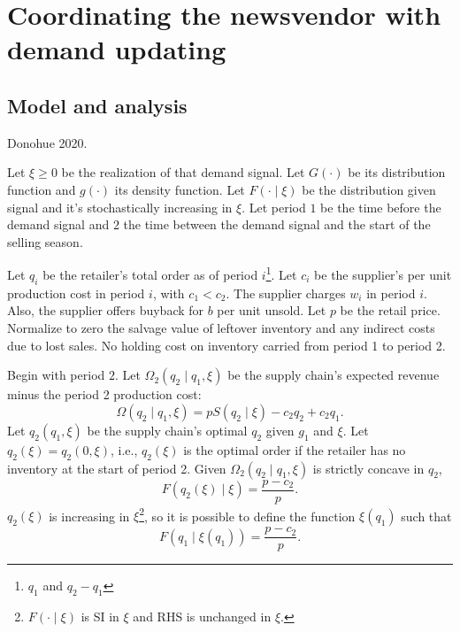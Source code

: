 \newpage
\section{Coordinating the newsvendor with demand updating}

\subsection{Model and analysis}
\begin{note}
    Donohue 2020.
\end{note}
Let $\xi\geq 0$ be the realization of that demand signal. Let $G(\cdot)$ be its distribution function and $g(\cdot)$ its density function. Let $F(\cdot\mid\xi)$ be the distribution given signal and it's stochastically increasing in $\xi$. Let period $1$ be the time before the demand signal and $2$ the time between the demand signal and the start of the selling season. 

Let $q_i$ be the retailer's total order as of period $i$\footnote{$q_1$ and $q_2-q_1$}. Let $c_i$ be the supplier's per unit production cost in period $i$, with $c_1<c_2$. The supplier charges $w_i$ in period $i$. Also, the supplier offers buyback for $b$ per unit unsold. Let $p$ be the retail price. Normalize to zero the salvage value of leftover inventory and any indirect costs due to lost sales. No holding cost on inventory carried from period 1 to period 2.

Begin with period $2$. Let $\Omega_2(q_2\mid q_1,\xi)$ be the supply chain's expected revenue minus the period 2 production cost:
\begin{equation}
    \Omega(q_2\mid q_1,\xi)=p S(q_2\mid \xi)-c_2 q_2+c_2 q_1.
\end{equation}
Let $q_2(q_1,\xi)$ be the supply chain's optimal $q_2$ given $g_1$ and $\xi$. Let $q_2(\xi)=q_2(0,\xi)$, i.e., $q_2(\xi)$ is the optimal order if the retailer has no inventory at the start of period 2. Given $\Omega_2(q_2\mid q_1,\xi)$ is strictly concave in $q_2$,
\begin{equation}
    F(q_2(\xi)\mid\xi)=\frac{p-c_2}{p}.
\end{equation}
$q_2(\xi)$ is increasing in $\xi$\footnote{$F(\cdot\mid \xi)$ is SI in $\xi$ and RHS is unchanged in $\xi$.}, so it is possible to define the function $\xi(q_1)$ such that 
\begin{equation}
    F(q_1\mid\xi(q_1))=\frac{p-c_2}{p}.
\end{equation}

